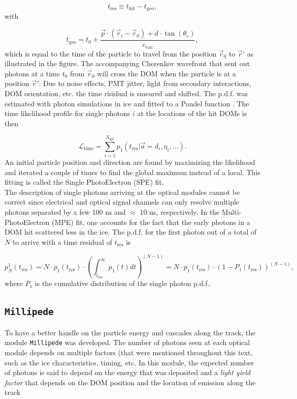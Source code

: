\begin{equation}
t_{\textrm{res}} \equiv t_{\textrm{hit}} - t_{\textrm{geo}},
\end{equation}
\noindent with

\begin{equation}
t_\textrm{geo} = t_0 + \frac{\vec{p} \cdot (\vec{r}_i - \vec{r}_0) + d\cdot \tan (\theta_c)}{c_\textrm{vac}},
\end{equation}
\noindent which is equal to the time of the particle to travel from the position $\vec{r}_0$ to $\vec{r}'$ as illustrated in the figure. The accompanying Cherenkov wavefront that sent out photons at a time $t_0$ from $\vec{r}_0$ will cross the DOM when the particle is at a position $\vec{r}'$. Due to noise effects, PMT jitter, light from secondary interactions, DOM orientation, etc. the time risidual is smeared and shifted. The p.d.f. was estimated with photon simulations in ice and fitted to a Pandel function \cite{Ahrens:2003fg}. The time likelihood profile for single photons $i$ at the locations of the hit DOMs is then

\begin{equation}
\mathcal{L}_\textrm{time} = \sum^{N_\textrm{hit}}_{i=1} p_1 (t_\textrm{res} | \vec{a} = {d_i,\eta_i,...}).
\end{equation}
\noindent An initial particle position and direction are found by maximizing the likelihood and iterated a couple of times to find the global maximum instead of a local. This fitting is called the Single PhotoElectron (SPE) fit.\\

\noindent The description of single photons arriving at the optical modules cannot be correct since electrical and optical signal channels can only resolve multiple photons separated by a few 100 ns and $\approx$ 10 ns, respectively. In the Multi-PhotoElectron (MPE) fit, one accounts for the fact that the early photons in a DOM hit scattered less in the ice. The p.d.f. for the first photon out of a total of $N$ to arrive with a time residual of $t_\textrm{res}$ is

\begin{equation}
p^1_N (t_\textrm{res}) = N \cdot p_1(t_\textrm{res}) \cdot \left(\int^\infty_{t_\textrm{res}} p_1(t) dt \right)^{(N-1)} = N \cdot p_1 (t_\textrm{res}) \cdot (1-P_1 (t_\textrm{res}))^{(N-1)},
\end{equation}
\noindent where $P_1$ is the cumulative distribution of the single photon p.d.f..
\subsection{\texttt{Millipede}}
To have a better handle on the particle energy and cascades along the track, the module \texttt{Millipede} was developed. The number of photons seen at each optical module depends on multiple factors (that were mentioned throughout this text, such as the ice characteristics, timing, etc. In this module, the expected number of photons is said to depend on the energy that was deposited and a \textit{light yield factor} that depends on the DOM position and the location of emission along the track

